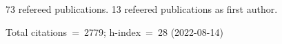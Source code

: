 73 refereed publications. 13 refeered publications as first author.

Total citations~=~2779; h-index~=~28 (2022-08-14)
